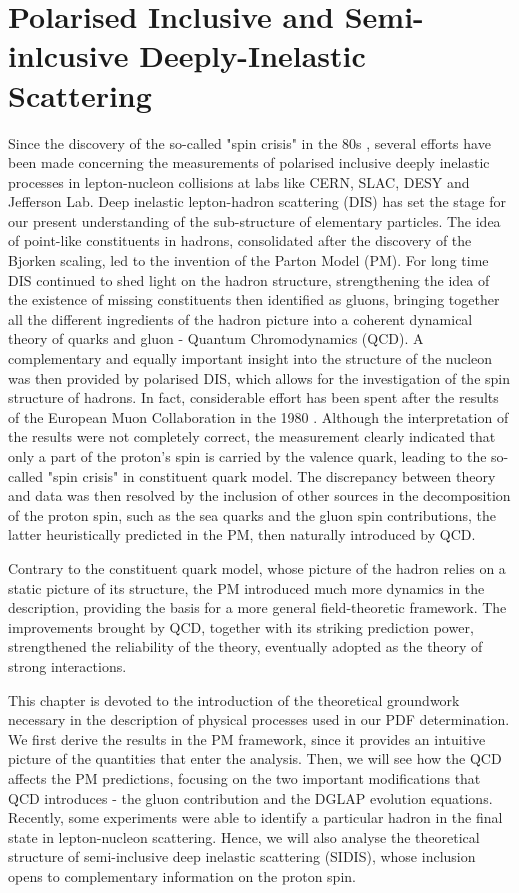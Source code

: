 \chapter{Polarised Inclusive and Semi-inlcusive Deeply-Inelastic Scattering}
\label{ch:2}

Since the discovery of the so-called "spin crisis" in the 80s \cite{Leader_Anselmino}, several efforts have been made concerning the measurements of polarised inclusive deeply inelastic processes in lepton-nucleon collisions at labs like CERN, SLAC, DESY and Jefferson Lab. Deep inelastic lepton-hadron scattering (DIS) has set the stage for our present understanding of the sub-structure of elementary particles. The idea of point-like constituents in hadrons, consolidated after the discovery of the Bjorken scaling, led to the invention of the Parton Model (PM). For long time DIS continued to shed light on the hadron structure, strengthening the idea of the existence of missing constituents then identified as gluons, bringing together all the different ingredients of the hadron picture into a coherent dynamical theory of quarks and gluon - Quantum Chromodynamics (QCD). A complementary and equally important insight into the structure of the nucleon was then provided by polarised DIS, which allows for the investigation of the spin structure of hadrons. In fact, considerable effort has been spent after the results of the European Muon Collaboration in the 1980 \cite{EuropeanMuon:1989yki}. Although the interpretation of the results were not completely correct, the measurement clearly indicated that only a part of the proton's spin is carried by the valence quark, leading to the so-called "spin crisis" in constituent quark model. The discrepancy between theory and data was then resolved by the inclusion of other sources in the decomposition of the proton spin, such as the sea quarks and the gluon spin contributions, the latter heuristically predicted in the PM, then naturally introduced by QCD.\par
Contrary to the constituent quark model, whose picture of the hadron relies on a static picture of its structure, the PM introduced much more dynamics in the description, providing the basis for a more general field-theoretic framework. The improvements brought by QCD, together with its striking prediction power, strengthened the reliability of the theory, eventually adopted as the theory of strong interactions.\par
This chapter is devoted to the introduction of the theoretical groundwork necessary in the description of physical processes used in our PDF determination. We first derive the results in the PM framework, since it provides an intuitive picture of the quantities that enter the analysis. Then, we will see how the QCD affects the PM predictions, focusing on the two important modifications that QCD introduces - the gluon contribution and the DGLAP evolution equations. Recently, some experiments were able to identify a particular hadron in the final state in lepton-nucleon scattering. Hence, we will also analyse the theoretical structure of semi-inclusive deep inelastic scattering (SIDIS), whose inclusion opens to complementary information on the proton spin.

